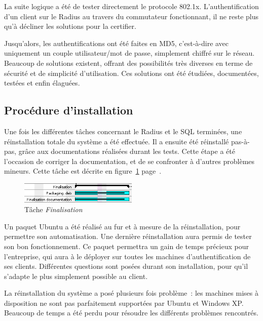La suite logique a été de tester directement le protocole 802.1x. L'authentification d'un client sur le Radius au travers du commutateur fonctionnant, il ne reste plus qu'à décliner les solutions pour la certifier.

Jusqu'alors, les authentifications ont été faites en MD5, c'est-à-dire avec uniquement un couple utilisateur/mot de passe, simplement chiffré sur le réseau. Beaucoup de solutions existent, offrant des possibilités très diverses en terme de sécurité et de simplicité d'utilisation. Ces solutions ont été étudiées, documentées, testées et enfin élaguées.

\subsection{Procédure d'installation}

Une fois les différentes tâches concernant le Radius et le SQL terminées, une réinstallation totale du système a été effectuée. Il a ensuite été réinstallé pas-à-pas, grâce aux documentations réalisées durant les tests. Cette étape a été l'occasion de corriger la documentation, et de se confronter à d'autres problèmes mineurs. Cette tâche est décrite en figure~\ref{gantt_finalisation} page~\pageref{gantt_finalisation}.

\begin{figure}[!h]
	\begin{center}
		\includegraphics[width=0.5\textwidth]{img/gantt_finalisation.png}
	\end{center}
	\caption{Tâche \textit{Finalisation}}
	\label{gantt_finalisation}
\end{figure}

Un paquet Ubuntu a été réalisé au fur et à mesure de la réinstallation, pour permettre son automatisation. Une dernière réinstallation aura permis de tester son bon fonctionnement. Ce paquet permettra un gain de temps précieux pour l'entreprise, qui aura à le déployer sur toutes les machines d'authentification de ses clients. Différentes questions sont posées durant son installation, pour qu'il s'adapte le plus simplement possible au client.

La réinstallation du système a posé plusieurs fois problème~: les machines mises à disposition ne sont pas parfaitement supportées par Ubuntu et Windows XP. Beaucoup de temps a été perdu pour résoudre les différents problèmes rencontrés.

